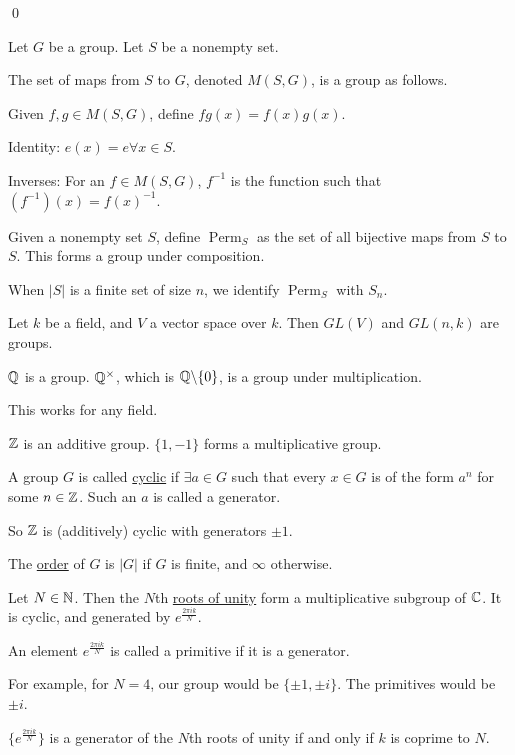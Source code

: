 \documentclass[x11names,reqno,14pt]{extarticle}
\begin{document}
\qed

\exm

Let $G$ be a group. Let $S$ be a nonempty set. 

The set of maps from $S$ to $G$, denoted $M(S, G)$, is a group as follows. 

Given $f, g \in M(S, G)$, define $fg(x) = f(x)g(x)$. 

Identity: $e(x) = e \forall x \in S$. 

Inverses: For an $f \in M(S, G)$, $f^{-1}$ is the function such that $(f^{-1})(x) = f(x)^{-1}$. 

\exm

Given a nonempty set $S$, define $\operatorname{Perm}_S$ as the set of all bijective maps from $S$ to $S$. This forms a group under composition. 

When $|S|$ is a finite set of size $n$, we identify $\operatorname{Perm}_S$ with $S_n$. 

\exm

Let $k$ be a field, and $V$ a vector space over $k$. Then $GL(V)$ and $GL(n, k)$ are groups. 

\exm

$\mathbb{Q}$ is a group. $\mathbb{Q}^\times$, which is $\mathbb{Q} \backslash\{0\}$, is a group under multiplication. 

This works for any field. 

\exm

$\mathbb{Z}$ is an additive group. $\{1, -1\}$ forms a multiplicative group. 


A group $G$ is called \underline{cyclic} if $\exists a \in G$ such that every $x \in G$ is of the form $a^n$ for some $n \in \mathbb{Z}$. Such an $a$ is called a generator. 

So $\mathbb{Z}$ is (additively) cyclic with generators $\pm 1$.


The \underline{order} of $G$ is $|G|$ if $G$ is finite, and $\infty$ otherwise. 


Let $N \in \mathbb{N}$. Then the $N$th \underline{roots of unity} form a multiplicative subgroup of $\mathbb{C}$. It is cyclic, and generated by $e^{\frac{2\pi i k}{N}}$. 

An element $e^{\frac{2\pi ik}{N}}$ is called a primitive if it is a generator. 

For example, for $N = 4$, our group would be $\{\pm 1, \pm i\}$. The primitives would be $\pm i$. 

$\{e^{\frac{2\pi i k}{N}}\}$ is a generator of the $N$th roots of unity if and only if $k$ is coprime to $N$. 
\end{document}
